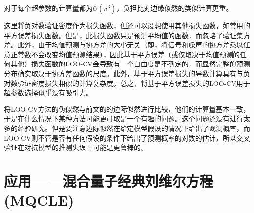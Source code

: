 \documentclass[12pt,UTF8]{article}
\begin{document}
                对于每个超参数的计算量都为$\mathcal{O}(n^3)$，负担比对边缘似然的类似计算更重。\par
                这里将负对数验证密度作为损失函数，但还可以设想使用其他损失函数，如常用的平方误差损失函数。但是，此损失函数只是预测平均值的函数，而忽略了验证集方差。此外，由于均值预测与协方差的大小无关（即，将信号和噪声的协方差乘以任意正常数不会改变均值预测结果），因此基于平方误差（或仅取决于均值预测的任何其他）损失函数的LOO-CV会导致有一个自由度是不确定的，而显然完整的预测分布确实取决于协方差函数的尺度。此外，基于平方误差损失的导数计算具有与负对数验证密度损失相似的计算复杂度。总之，将基于平方误差损失的LOO-CV用于超参数选择似乎没有吸引力。\par
                将LOO-CV方法的伪似然与前文的的边际似然进行比较，他们的计算量基本一致，于是在什么情况下某种方法可能更可取是一个有趣的问题。这个问题还没有进行太多的经验研究。但是要注意边际似然在给定模型假设的情况下给出了观测概率，而LOO-CV则不管是否有任何假设的条件下给出了预测概率的对数的估计，所以交叉验证在对抗模型的推测失误上可能是更鲁棒的。
    \section{应用——混合量子经典刘维尔方程(MQCLE)}
\end{document}

